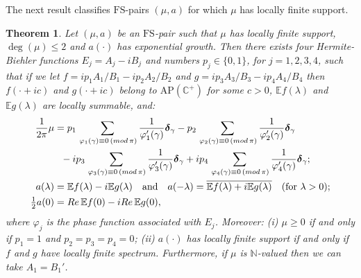\documentclass[a4paper,reqno,12pt]{amsart}
\newtheorem{theorem}{Theorem}
\newcommand{\E}{\mathcal{E}}
\renewcommand{\H}{\mathbb{C}^+}
\newcommand{\n}{\mathbb{N}}
\newcommand{\re}{{\rm Re}\,}
\newcommand{\bo}{\boldsymbol}
\newcommand{\la}{\lambda}
\newcommand{\ga}{\gamma}
\newcommand{\p}{\varphi}
\newcommand{\1}{{\bf 1}}
\newcommand{\apc}{\mathrm{AP}(\H)}
\newcommand{\fs}{\mathrm{FS}}
\renewcommand{\E}{\mathbb{E}}
\newcommand{\ov}[1]{\overline{#1}}
\renewcommand{\1}{{\bo 1}}
\newcommand{\del}{{\bo \delta}}
\renewcommand{\a}{a(\cdot)}
\begin{document}
The next result classifies $\fs$-pairs $(\mu,a)$ for which $\mu$ has locally finite support.

\begin{theorem}\label{thm:HBmudisc}
Let $(\mu,a)$ be an $\fs$-pair such that $\mu$ has locally finite support, $\deg(\mu)\leq 2$ and $\a$ has exponential growth. Then there exists four Hermite-Biehler functions $E_j=A_j-iB_j$ and numbers $p_j\in \{0,1\}$, for $j=1,2,3,4$, such that if we let $f=ip_1A_1/B_1-ip_2A_2/B_2$ and $g=ip_3A_3/B_3-ip_4A_4/B_4$ then $f(\cdot+ic)$ and $g(\cdot+ic)$ belong to $\apc$ for some $c>0$, $\E f(\la)$ and $\E g(\la)$ are locally summable, and:
\begin{align}
\begin{split}\label{def:genmua}
        \frac1{2\pi}{\mu} & = p_1\sum_{\, \p_1(\ga)\equiv 0 \,({\rm mod} \, \pi)} \frac{1}{\p_1'(\ga)} {\del}_{\ga}-p_2\sum_{\, \p_2(\ga)\equiv 0 \,({\rm mod} \, \pi)} \frac{1}{\p_2'(\ga)} {\del}_{\ga} \\
 & \ \  -  ip_3\sum_{\, \p_3(\ga)\equiv 0 \,({\rm mod} \, \pi)} \frac{1}{\p_3'(\ga)} {\del}_{\ga}+ip_4\sum_{\, \p_4(\ga)\equiv 0 \,({\rm mod} \, \pi)} \frac{1}{\p_4'(\ga)} {\del}_{\ga}; \\
a(\la) & =\E f(\la)-i\E g(\la) \quad \text{and} \quad a(-\la)  =\ov{\E f(\la)+i\E g(\la)} \quad (\text{for } \la>0);\\
\tfrac1{2}a(0)  & =\re \E f(0)-i\re\E g(0),
\end{split}
\end{align}
where $\p_j$ is the phase function associated with $E_j$. Moreover: (i) $\mu\geq 0$ if and only if $p_1=1$ and $p_2=p_3=p_4=0$; (ii) $\a$ has locally finite support if and only if $f$ and $g$ have locally finite spectrum. Furthermore, if $\mu$ is $\n$-valued then we can take $A_1=B_1'$.
\end{theorem}
\end{document}
